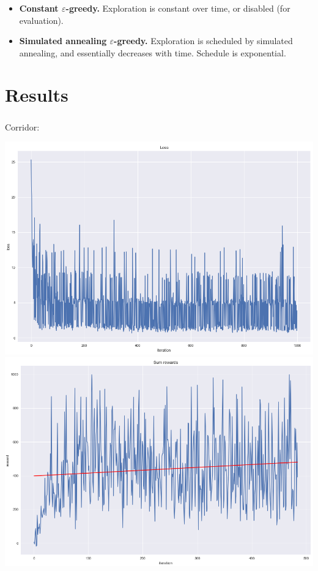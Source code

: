 \documentclass[t]{beamer}
\begin{document}
\begin{frame}
	\frametitle{\insertsection}
		\begin{itemize}
		    \item {\bf Constant $\varepsilon$-greedy.} Exploration is constant over time, or disabled (for evaluation).
		    \item {\bf Simulated annealing $\varepsilon$-greedy.} Exploration is scheduled by simulated annealing, and essentially decreases with time. Schedule is exponential.
		\end{itemize}
\end{frame}

\section{Results}

\begin{frame}
	\frametitle{\insertsection}
	Corridor:

	\includegraphics[height=0.43\textheight]{images/corridor_loss.png}
	\includegraphics[height=0.43\textheight]{images/corridor_rewards.png}
\end{frame}
\end{document}
